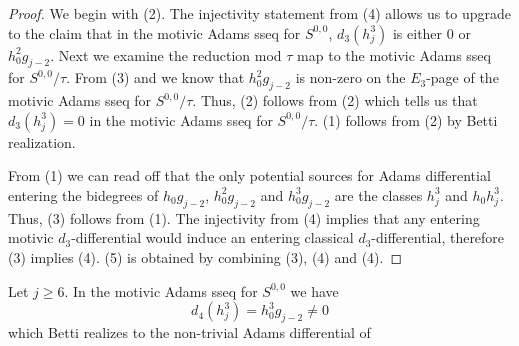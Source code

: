 \begin{proof}
  We begin with (2).
  The injectivity statement from (4) allows us to upgrade
   to the claim that
  in the motivic Adams sseq for $S^{0,0}$, $d_3(h_j^3)$ is either $0$ or $h_0^2g_{j-2}$.
  Next we examine the reduction mod $\tau$ map to the motivic Adams sseq for $S^{0,0}/\tau$.  
  From (3) and 
  we know that $h_0^2g_{j-2}$ is non-zero
  on the $E_3$-page of the motivic Adams sseq for $S^{0,0}/\tau$.
  Thus, (2) follows from (2) which tells us that
  $d_3(h_j^3) = 0$ in the motivic Adams sseq for $S^{0,0}/\tau$.
  (1) follows from (2) by Betti realization.
        
  From (1) we can read off that the only potential sources for Adams differential entering the bidegrees of $h_0g_{j-2}$, $h_0^2 g_{j-2}$ and $h_0^3 g_{j-2}$ are
  the classes $h_j^3$ and $h_0h_j^3$.
  Thus, (3) follows from (1).
  The injectivity from (4) implies that any entering motivic $d_3$-differential would induce an entering classical $d_3$-differential, therefore (3) implies (4).  
  (5) is obtained by combining (3), (4) and (4).
\end{proof}

\begin{thm} \label{thm:motivic d4}
  Let $j \geq 6$.
  In the motivic Adams sseq for $S^{0,0}$ we have
  \[ d_4(h_j^3) = h_0^3g_{j-2} \neq 0 \]
  which Betti realizes to the non-trivial Adams differential of 
\end{thm}

